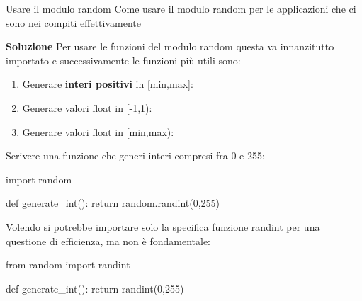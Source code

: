\documentclass[10pt]{extarticle}
\makeatletter
\newcommand{\<}{\langle}
\renewcommand{\>}{\rangle}
\renewenvironment{proof}[1][\proofname] {\par\pushQED{\qed}
\renewcommand*{\proofname}{Soluzione}
{\normalfont\sffamily\bfseries\topsep6\p@\@plus6\p@\relax #1\@addpunct{.} }}{\popQED\endtrivlist\@endpefalse}
\theoremstyle{mystyle}{\newtheorem*{remark}{Nota}}
\theoremstyle{mystyle}{\newtheorem*{remarks}{Note}}
\theoremstyle{mystyle}{\newtheorem*{example}{Esempio}}
\theoremstyle{mystyle}{\newtheorem*{examples}{Esempi}}
\theoremstyle{definition}{\newtheorem*{exercise}{Exercise}}
\theoremstyle{warn}
\makeatother
\begin{document}
\begin{definition}{Usare il modulo random}
Come usare il modulo random per le applicazioni che ci sono nei compiti effettivamente
\end{definition}
\begin{proof}
Per usare le funzioni del modulo random questa va innanzitutto importato  e successivamente le funzioni più utili sono:
\begin{enumerate}
    \item Generare \textbf{interi positivi} in [min,max]: 
    \item Generare valori float in [-1,1): 
    \item Generare valori float in [min,max): 
\end{enumerate}
\end{proof}
\begin{example}
Scrivere una funzione che generi interi compresi fra 0 e 255:
\begin{python}
import random

def generate_int():
    return random.randint(0,255)
\end{python}
\end{example}
\begin{remark}
Volendo si potrebbe importare solo la specifica funzione randint per una questione di efficienza, ma non è fondamentale:
\begin{python}
from random import randint

def generate_int():
    return randint(0,255)
\end{python}
\end{remark}
\end{document}
